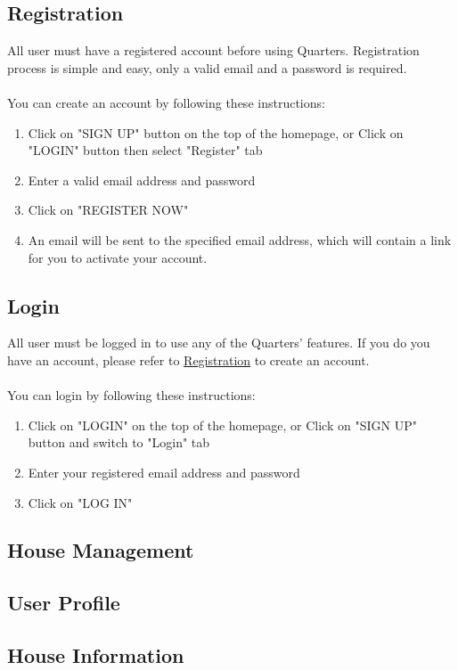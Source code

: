 \documentclass[12pt]{article}
\begin{document}
\subsection{Registration}
\label{sec:registration}
All user must have a registered account before using Quarters. Registration process is simple and easy, only a valid email and a password is required.\\\\
You can create an account by following these instructions:

\begin{enumerate}
    \item Click on "SIGN UP" button on the top of the homepage, or Click on "LOGIN" button then select "Register" tab
    \item Enter a valid email address and password
    \item Click on "REGISTER NOW"
    \item An email will be sent to the specified email address, which will contain a link for you to activate your account.
\end{enumerate}
\subsection{Login}
All user must be logged in to use any of the Quarters' features. If you do you have an account, please refer to \hyperref[sec:registration]{Registration} to create an account. \\ \\
You can login by following these instructions:
\begin{enumerate}
    \item Click on "LOGIN" on the top of the homepage, or Click on "SIGN UP" button and switch to "Login" tab
    \item Enter your registered email address and password
    \item Click on "LOG IN"
\end{enumerate}
\subsection{House Management}

\subsection{User Profile}

\subsection{House Information}
\end{document}
